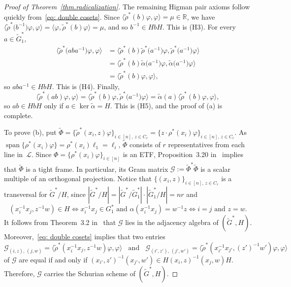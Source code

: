 \documentclass[11pt]{article}
\theoremstyle{definition}
\numberwithin{equation}{section}
\begin{document}
\begin{proof}[Proof of Theorem~\ref{thm.radicalization}]
The remaining Higman pair axioms follow quickly from~\eqref{eq: double cosets}.
Since $\langle \tilde{\rho}^*(b) \varphi, \varphi \rangle = \mu \in \mathbb{R}$, we have $\bigl\langle \tilde{\rho}^*\bigl(b^{-1}\bigr) \varphi, \varphi \bigr\rangle = \langle  \varphi, \tilde{\rho}^*(b) \varphi \rangle = \mu$, and so $b^{-1} \in HbH$.
This is (H3).
For every $a \in \widetilde{G}_1^*$, 
\begin{align*}
\bigl\langle \tilde{\rho}^*\bigl(aba^{-1}\bigr) \varphi, \varphi \bigr\rangle 
&= \bigl\langle \tilde{\rho}^*(b) \tilde{\rho}^*\bigl(a^{-1}\bigr) \varphi, \tilde{\rho}^*\bigl(a^{-1}\bigr)\varphi \bigr\rangle \\
&= \bigl\langle \tilde{\rho}^*(b) \widetilde{\alpha}\bigl(a^{-1}\bigr) \varphi, \widetilde{\alpha}\bigl(a^{-1}\bigr)\varphi \bigr\rangle \\
&= \langle \tilde{\rho}^*(b) \varphi, \varphi \rangle,
\end{align*}
so $aba^{-1} \in HbH$.
This is (H4).
Finally, 
\[ 
\langle \tilde{\rho}^*(ab) \varphi, \varphi \rangle 
= \bigl\langle \tilde{\rho}^*(b) \varphi, \tilde{\rho}^*\bigl(a^{-1}\bigr) \varphi \bigr\rangle 
= \widetilde{\alpha}(a) \langle \tilde{\rho}^*(b) \varphi, \varphi \rangle,
\]
so $ab \in HbH$ only if $a \in \ker \widetilde{\alpha} = H$.
This is (H5), and the proof of (a) is complete.

To prove (b), put $\widetilde{\Phi} = \{ \tilde{\rho}^*(x_i, z) \varphi \}_{i \in [n],\, z \in C_r} = \{ z\cdot \rho^*(x_i) \varphi \}_{i\in [n],\, z \in C_r}$.
As $\operatorname{span}\{ \rho^*(x_i) \varphi \} = \rho^*(x_i) \ell_1 = \ell_i$, $\widetilde{\Phi}$ consists of $r$ representatives from each line in~$\mathscr{L}$.
Since $\Phi = \{ \rho^*(x_i) \varphi \}_{i \in [n]}$ is an ETF, Proposition~3.20 in~\cite{IversonJM:17} implies that $\widetilde{\Phi}$ is a tight frame.
In particular, its Gram matrix $\mathcal{G} := \widetilde{\Phi}^* \widetilde{\Phi}$ is a scalar multiple of an orthogonal projection.
Notice that $\{ (x_i, z) \}_{i \in [n],\, z \in C_r}$ is a transversal for $\widetilde{G}^*/H$, since $|\widetilde{G}^*/H| = |\widetilde{G}^*/\widetilde{G}_1^*|\cdot |\widetilde{G}_1^*/H| = nr$ and 
\[ (x_i^{-1} x_j, z^{-1} w) \in H \iff x_i^{-1} x_j \in G_1^*\text{ and } \alpha(x_i^{-1} x_j) = w^{-1} z \iff i=j \text{ and } z=w. \]
It follows from Theorem~3.2 in~\cite{IversonJM:17} that $\mathcal{G}$ lies in the adjacency algebra of $(\widetilde{G}^*,H)$.
Moreover,~\eqref{eq: double cosets} implies that two entries
\[ \mathcal{G}_{(i,z),\, (j,w)} = \langle \tilde{\rho}^*(x_i^{-1} x_j, z^{-1} w) \varphi, \varphi \rangle \:\:\:\: \text{and} \:\:\:\: \mathcal{G}_{(i',z'),\, (j',w')} = \langle \tilde{\rho}^*(x_{i'}^{-1} x_{j'}, (z')^{-1} {w'}) \varphi, \varphi \rangle \]
of $\mathcal{G}$ are equal if and only if $(x_{i'},z')^{-1} (x_{j'},w') \in H(x_i,z)^{-1} (x_j,w) H$.
Therefore, $\mathcal{G}$ carries the Schurian scheme of $(\widetilde{G}^*,H)$.


\end{proof}
\end{document}
